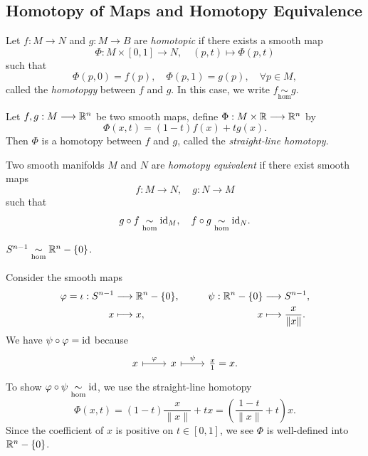 \newcommand{\simH}{\underset{\mathrm{hom}}{\sim}}

\subsection*{Homotopy of Maps and Homotopy Equivalence}

\begin{definition}
    Let \(f:M\longrightarrow N\) and \(g:M\longrightarrow B\) are \emph{homotopic} if there exists a smooth map \[
        \Phi:M\times[0,1]\longrightarrow N, \quad (p,t)\longmapsto \Phi(p,t)
    \] such that \[
        \Phi(p,0) = f(p),\quad \Phi(p,1) = g(p),\quad \forall p\in M,
    \]
    called the \emph{homotopgy} between \(f\) and \(g\). In this case, we write \(f\simH g\).
\end{definition}

\begin{example}
    Let \(f,g: M\longrightarrow\mathbb{R}^n\) be two smooth maps, define \(\Phi:M\times\mathbb{R}\longrightarrow\mathbb{R}^n\) by \[
        \Phi(x,t) = (1-t)f(x) + tg(x).
    \] Then \(\Phi\) is a homotopy between \(f\) and \(g\), called the \emph{straight-line homotopy}.
\end{example}

\begin{definition}
    Two smooth manifolds \(M\) and \(N\) are \emph{homotopy equivalent} if there exist smooth maps \[
        f:M\longrightarrow N,\quad g:N\longrightarrow M
    \] such that \[
        g\circ f \simH \id_M,\quad f\circ g \simH \id_N.
    \]
\end{definition}

\begin{example}
    \(S^{n-1} \simH \R^n\setminus\{0\}\).
    \begin{roof}
        Consider the smooth maps \begin{alignat*}{2}
            \varphi=\iota: S^{n-1}
                &\longrightarrow \mathbb{R}^n\mathbin{-}\{0\},
            &\qquad \psi: \mathbb{R}^n\mathbin{-}\{0\}
                &\longrightarrow S^{n-1},\\
            x &\longmapsto x,
            & x &\longmapsto \frac{x}{\|x\|}.
        \end{alignat*}
        We have \(\psi\circ\varphi = \mathrm{id}\) because \[
            \begin{tikzcd}
                x \ar[|->]{r}{\f} & x \ar[|->]{r}{\psi} & \frac{x}{1} = x.
            \end{tikzcd}
        \]
        To show \(\f\circ\psi \simH \id\), we use the straight-line homotopy \[
            \Phi(x,t) = (1 - t)\frac{x}{\|x\|} + tx
            = \left(\frac{1 - t}{\|x\|} + t\right)x.
        \] Since the coefficient of \(x\) is positive on \(t\in [0,1]\), we see \(\Phi\) is well-defined into \(\mathbb{R}^n\mathbin{-}\{0\}\).
    \end{roof}
\end{example}

